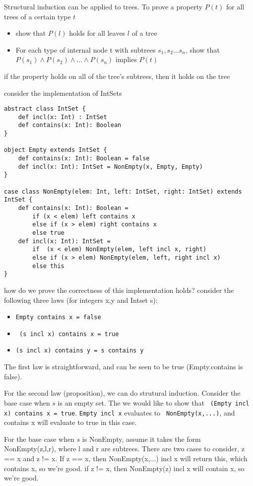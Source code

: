 Structural induction can be applied to trees.
To prove a property $P(t)$ for all trees of a certain type $t$
\begin{itemize}
	\item show that $P(l)$ holds for all leaves $l$ of a tree
	\item For each type of internal node t with subtrees $s_1, s_2 \ldots s_n$, show that
	$P(s_1)\wedge P(s_2)\wedge \ldots \wedge P(s_n)$ implies $P(t)$ 
\end{itemize}

if the property holds on all of the tree's subtrees, then it holds on the tree


consider the implementation of IntSets

\begin{lstlisting}
abstract class IntSet {
	def incl(x: Int) : IntSet
	def contains(x: Int): Boolean
}

object Empty extends IntSet {
	def contains(x: Int): Boolean = false
	def incl(x: Int): IntSet = NonEmpty(x, Empty, Empty)
}

case class NonEmpty(elem: Int, left: IntSet, right: IntSet) extends IntSet {
	def contains(x: Int): Boolean = 
		if (x < elem) left contains x
		else if (x > elem) right contains x
		else true
	def incl(x: Int): IntSet = 
		if  (x < elem) NonEmpty(elem, left incl x, right)
		else if (x > elem) NonEmpty(elem, left, right incl x)
		else this
}
\end{lstlisting}

how do we prove the correctness of this implementation holds? 
consider the following three laws (for integers x,y and Intset s):
\begin{itemize}
	\item \lstinline|Empty contains x = false|
	\item \lstinline| (s incl x) contains x = true|
	\item \lstinline|(s incl x) contains y = s contains y|
\end{itemize}

The first law is straightforward, and can be seen to be true (Empty.contains is false). 

For the second law (proposition), we can do strutural induction. Consider the base case when $s$ is an empty set. The we would like to show that \lstinline| (Empty incl x) contains x = true|. \lstinline|Empty incl x| evaluates to \lstinline| NonEmpty(x,...)|, and contains x will evaluate to true in this case.

For the base case when $s$ is NonEmpty, assume it takes the form NonEmpty(z,l,r), where l and r are subtrees. There are two cases to consider, z == x and z != x. If z == x, then NonEmpty(x,...) incl x will return this, which contains x, so we're good. if z != x, then NonEmpty(z) incl x will contain x, so we're good.
